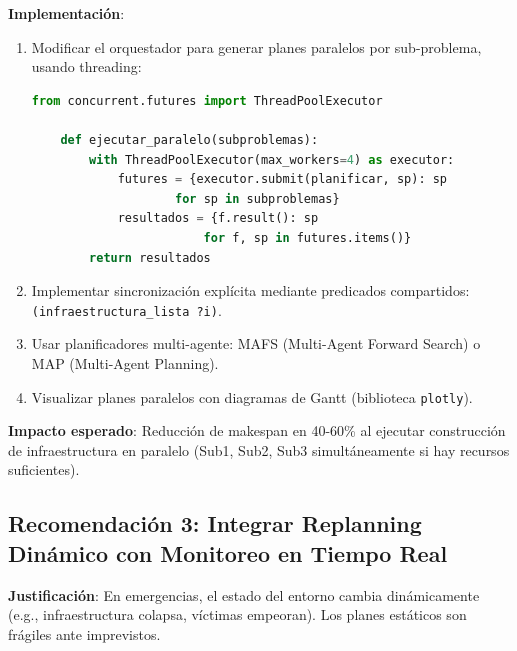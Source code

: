 \documentclass[conference]{IEEEtran}
\begin{document}
    \textbf{Implementación}:
    \begin{enumerate}[leftmargin=*,itemsep=1pt]
    \item Modificar el orquestador para generar planes paralelos por sub-problema, usando threading:
    \begin{lstlisting}[language=Python]
    from concurrent.futures import ThreadPoolExecutor

    def ejecutar_paralelo(subproblemas):
        with ThreadPoolExecutor(max_workers=4) as executor:
            futures = {executor.submit(planificar, sp): sp 
                    for sp in subproblemas}
            resultados = {f.result(): sp 
                        for f, sp in futures.items()}
        return resultados
    \end{lstlisting}
    \item Implementar sincronización explícita mediante predicados compartidos: \texttt{(infraestructura\_lista ?i)}.
    \item Usar planificadores multi-agente: MAFS (Multi-Agent Forward Search) o MAP (Multi-Agent Planning).
    \item Visualizar planes paralelos con diagramas de Gantt (biblioteca \texttt{plotly}).
    \end{enumerate}

    \textbf{Impacto esperado}: Reducción de makespan en 40-60\% al ejecutar construcción de infraestructura en paralelo (Sub1, Sub2, Sub3 simultáneamente si hay recursos suficientes).

    \subsection{Recomendación 3: Integrar Replanning Dinámico con Monitoreo en Tiempo Real}

    \textbf{Justificación}: En emergencias, el estado del entorno cambia dinámicamente (e.g., infraestructura colapsa, víctimas empeoran). Los planes estáticos son frágiles ante imprevistos.
\end{document}
